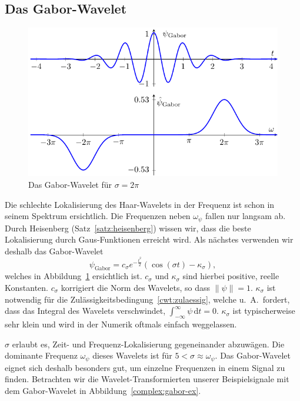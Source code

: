 \subsection{Das Gabor-Wavelet}
\begin{figure}
	\centering
	\includegraphics{papers/complex/images/gabor.pdf}
	\caption{Das Gabor-Wavelet für $\sigma = 2\pi$ \label{complex:gabor}}
\end{figure}

Die schlechte Lokalisierung des Haar-Wavelets in der Frequenz ist schon in seinem Spektrum ersichtlich.
Die Frequenzen neben $\omega_\psi$ fallen nur langsam ab.
Durch Heisenberg (Satz~\ref{satz:heisenberg}) wissen wir, dass die beste Lokalisierung durch Gaus-Funktionen erreicht wird.
Als nächstes verwenden wir deshalb das Gabor-Wavelet
\[
	\psi_\text{Gabor} = c_\sigma e^{-\frac{t^2}{2}}\left(\cos\left(\sigma t\right) - \kappa_\sigma\right),
\]
welches in Abbildung~\ref{complex:gabor} ersichtlich ist.
$c_\sigma$ und $\kappa_\sigma$ sind hierbei positive, reelle Konstanten.
$c_\sigma$ korrigiert die Norm des Wavelets, so dass $\|\psi\| = 1$.
$\kappa_\sigma$ ist notwendig für die Zulässigkeitsbedingung~\eqref{cwt:zulaessig}, welche u.~A.~fordert, dass das Integral des Wavelets verschwindet,  $\int_{-\infty}^{\infty}\psi\,\mathrm{d}t = 0$.
$\kappa_\sigma$ ist typischerweise sehr klein und wird in der Numerik oftmals einfach weggelassen.

$\sigma$ erlaubt es, Zeit- und Frequenz-Lokalisierung gegeneinander abzuwägen.
Die dominante Frequenz $\omega_\psi$ dieses Wavelets ist für $5 < \sigma \approx \omega_\psi$.
Das Gabor-Wavelet eignet sich deshalb besonders gut, um einzelne Frequenzen in einem Signal zu finden.
Betrachten wir die Wavelet-Transformierten unserer Beispielsignale mit dem Gabor-Wavelet in Abbildung~\ref{complex:gabor-ex}.

